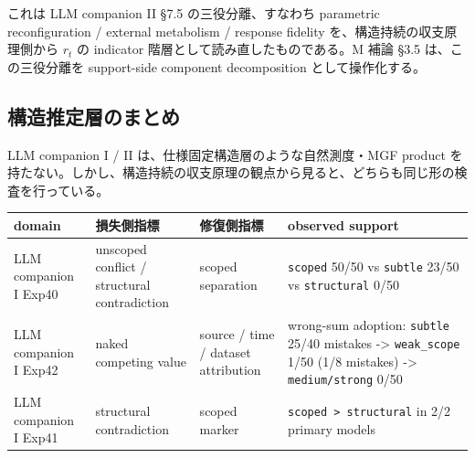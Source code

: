 \documentclass[12pt,a4paper]{article}
\begin{document}
これは LLM companion II §7.5 の三役分離、すなわち parametric reconfiguration / external metabolism / response fidelity を、構造持続の収支原理側から \(r_{t}\) の indicator 階層として読み直したものである。M 補論 §3.5 は、この三役分離を support-side component decomposition として操作化する。

\subsection{構造推定層のまとめ}\label{ux69cbux9020ux63a8ux5b9aux5c64ux306eux307eux3068ux3081}

LLM companion I / II は、仕様固定構造層のような自然測度・MGF product を持たない。しかし、構造持続の収支原理の観点から見ると、どちらも同じ形の検査を行っている。

{\def\LTcaptype{table} %
\begin{longtable}[]{@{}
  >{\raggedright\arraybackslash}p{}
  >{\raggedright\arraybackslash}p{}
  >{\raggedright\arraybackslash}p{}
  >{\raggedright\arraybackslash}p{}@{}}
\toprule\noalign{}
\begin{minipage}[b]{\linewidth}\raggedright
domain
\end{minipage} & \begin{minipage}[b]{\linewidth}\raggedright
損失側指標
\end{minipage} & \begin{minipage}[b]{\linewidth}\raggedright
修復側指標
\end{minipage} & \begin{minipage}[b]{\linewidth}\raggedright
observed support
\end{minipage} \\
\midrule\noalign{}
\endhead
\bottomrule\noalign{}
\endlastfoot
LLM companion I Exp40 & unscoped conflict / structural contradiction & scoped separation & \texttt{scoped} 50/50 vs \texttt{subtle} 23/50 vs \texttt{structural} 0/50 \\
LLM companion I Exp42 & naked competing value & source / time / dataset attribution & wrong-sum adoption: \texttt{subtle} 25/40 mistakes -\textgreater{} \texttt{weak\_scope} 1/50 (1/8 mistakes) -\textgreater{} \texttt{medium/strong} 0/50 \\
LLM companion I Exp41 & structural contradiction & scoped marker & \texttt{scoped\ \textgreater{}\ structural} in 2/2 primary models \\

\end{longtable}}
\end{document}
